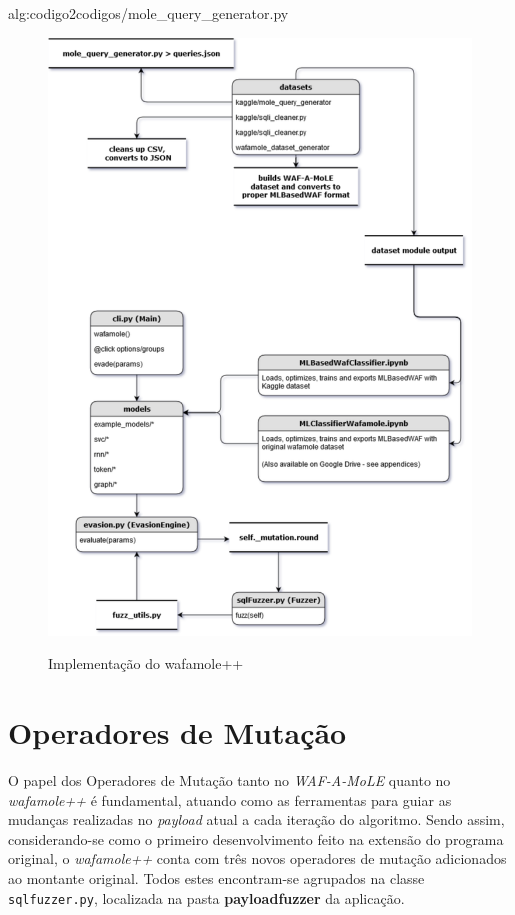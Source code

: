 \label{sec:codigos}
 {alg:codigo2}{codigos/mole_query_generator.py}
\bigskip

\begin{figure}[H]
    \centering
    \caption{Implementação do wafamole++}
    \includegraphics[width=16cm]{figuras/wafamole++_architecture.png} 
    \label{fig:internet} 
\end{figure}

\section{Operadores de Mutação}

O papel dos Operadores de Mutação tanto no \textit{WAF-A-MoLE} quanto no \textit{wafamole++} é fundamental, atuando como as ferramentas para guiar as mudanças realizadas no \textit{payload} atual a cada iteração do algoritmo. Sendo assim, considerando-se como o primeiro desenvolvimento feito na extensão do programa original, o \textit{wafamole++} conta com três novos operadores de mutação adicionados ao montante original. Todos estes encontram-se agrupados na classe \verb+sqlfuzzer.py+, localizada na pasta \textbf{payloadfuzzer} da aplicação.

